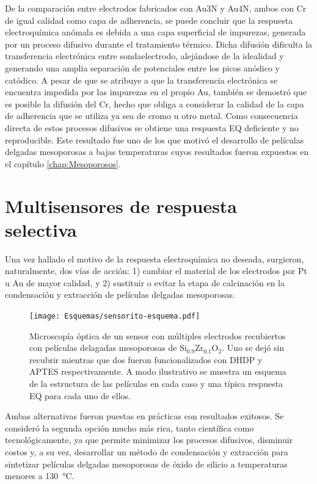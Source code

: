 		    De la comparación entre electrodos fabricados con Au3N y Au4N, ambos con Cr de igual calidad como capa de adherencia, se puede concluir que la respuesta electroquímica anómala es debida a una capa superficial de impurezas, generada por un proceso difusivo durante el tratamiento térmico. Dicha difusión dificulta la transferencia electrónica entre sonda\textbar electrodo, alejándose de la idealidad y generando una amplia separación de potenciales entre los picos anódico y catódico. A pesar de que se atribuye a que la transferencia electrónica se encuentra impedida por las impurezas en el propio Au, también se demostró que es posible la difusión del Cr, hecho que obliga a considerar la calidad de la capa de adherencia que se utiliza ya sea de cromo u otro metal. Como consecuencia directa de estos procesos difusivos se obtiene una respuesta EQ deficiente y no reproducible. Este resultado fue uno de los que motivó el desarrollo de películas delgadas mesoporosas a bajas temperaturas cuyos resultados fueron expuestos en el capítulo \ref{chap:Mesoporosos}.

\section{Multisensores de respuesta selectiva}

			Una vez hallado el motivo de la respuesta electroquímica no deseada, surgieron, naturalmente, dos vías de acción: 1) cambiar el material de los electrodos por Pt u Au de mayor calidad, y 2) sustituir o evitar la etapa de calcinación en la condensación y extracción de películas delgadas mesoporosas.

				\begin{figure}[b!]
		 	       	\begin{center}
		 	       	\texttt{[image: Esquemas/sensorito-esquema.pdf]}
		        	\caption[Esquema de sensores EQ selectivos]{Microscopía óptica de un sensor con múltiples electrodos recubiertos con películas delagadas mesoporosas de Si$_{0.9}$Zr$_{0.1}$O$_2$. Uno se dejó sin recubrir mientras que dos fueron funcionalizados con DHDP y APTES respectivamente. A modo ilustrativo se muestra un esquema de la estructura de las películas en cada caso y una típica respuesta EQ para cada uno de ellos.}
		         	\label{fig:sensor-calesita}
		         	\end{center}
		     		\end{figure}

			Ambas alternativas fueron puestas en prácticas con resultados exitosos. Se consideró la segunda opción mucho más rica, tanto científica como tecnológicamente, ya que permite minimizar los procesos difusivos, disminuir costos y, a su vez, desarrollar un método de condensación y extracción para sintetizar películas delgadas mesoporosas de óxido de silicio a temperaturas menores a \SI{130}{\celsius}. 

